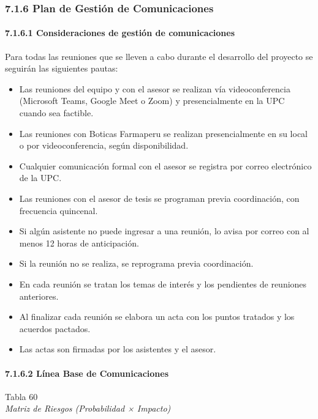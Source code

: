 \documentclass[12pt,a4paper,oneside]{report}
\begin{document}
\subsubsection{7.1.6 Plan de Gestión de
Comunicaciones}\label{plan-de-gestiuxf3n-de-comunicaciones}

\paragraph{7.1.6.1 Consideraciones de gestión de
comunicaciones}\label{consideraciones-de-gestiuxf3n-de-comunicaciones}

Para todas las reuniones que se lleven a cabo durante el desarrollo del
proyecto se seguirán las siguientes pautas:

\begin{itemize}
\item
  Las reuniones del equipo y con el asesor se realizan vía
  videoconferencia (Microsoft Teams, Google Meet o Zoom) y
  presencialmente en la UPC cuando sea factible.
\item
  Las reuniones con Boticas Farmaperu se realizan presencialmente en su
  local o por videoconferencia, según disponibilidad.
\item
  Cualquier comunicación formal con el asesor se registra por correo
  electrónico de la UPC.
\item
  Las reuniones con el asesor de tesis se programan previa coordinación,
  con frecuencia quincenal.
\item
  Si algún asistente no puede ingresar a una reunión, lo avisa por
  correo con al menos 12 horas de anticipación.
\item
  Si la reunión no se realiza, se reprograma previa coordinación.
\item
  En cada reunión se tratan los temas de interés y los pendientes de
  reuniones anteriores.
\item
  Al finalizar cada reunión se elabora un acta con los puntos tratados y
  los acuerdos pactados.
\item
  Las actas son firmadas por los asistentes y el asesor.
\end{itemize}

\paragraph{7.1.6.2 Línea Base de
Comunicaciones}\label{luxednea-base-de-comunicaciones}

\label{_Toc231672315}{}Tabla 60\\
\emph{Matriz de Riesgos (Probabilidad × Impacto)}
\end{document}
